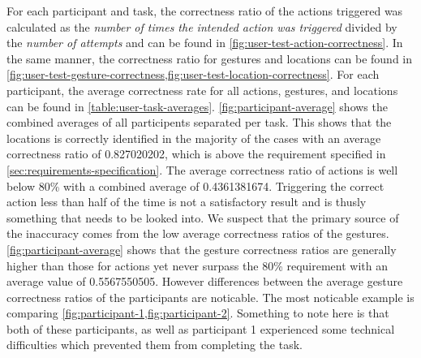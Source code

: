 For each participant and task, the correctness ratio of the actions triggered was calculated as the \emph{number of times the intended action was triggered} divided by the \emph{number of attempts} and can be found in \cref{fig:user-test-action-correctness}.
In the same manner, the correctness ratio for gestures and locations can be found in \cref{fig:user-test-gesture-correctness,fig:user-test-location-correctness}.
For each participant, the average correctness rate for all actions, gestures, and locations can be found in \cref{table:user-task-averages}.
\cref{fig:participant-average} shows the combined averages of all participents separated per task.
This shows that the locations is correctly identified in the majority of the cases with an average correctness ratio of 0.827020202, which is above the requirement specified in \cref{sec:requirements-specification}.
The average correctness ratio of actions is well below 80\% with a combined average of 0.4361381674.
Triggering the correct action less than half of the time is not a satisfactory result and is thusly something that needs to be looked into.
We suspect that the primary source of the inaccuracy comes from the low average correctness ratios of the gestures.
\cref{fig:participant-average} shows that the gesture correctness ratios are generally higher than those for actions yet never surpass the 80\% requirement with an average value of 0.5567550505.
However differences between the average gesture correctness ratios of the participants are noticable.
The most noticable example is comparing \cref{fig:participant-1,fig:participant-2}.
Something to note here is that both of these participants, as well as participant 1 experienced some technical difficulties which prevented them from completing the task.

